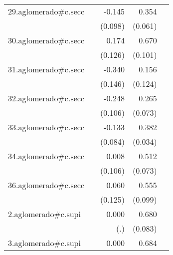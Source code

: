 {\begin{longtable}{l*{4}{D{.}{.}{-1}}}
\addlinespace
29.aglomerado#c.secc&                     &      -0.145         &       0.354\sym{***}&                     \\
            &                     &     (0.098)         &     (0.061)         &                     \\
\addlinespace
30.aglomerado#c.secc&                     &       0.174         &       0.670\sym{***}&                     \\
            &                     &     (0.126)         &     (0.101)         &                     \\
\addlinespace
31.aglomerado#c.secc&                     &      -0.340\sym{*}  &       0.156         &                     \\
            &                     &     (0.146)         &     (0.124)         &                     \\
\addlinespace
32.aglomerado#c.secc&                     &      -0.248\sym{*}  &       0.265\sym{***}&                     \\
            &                     &     (0.106)         &     (0.073)         &                     \\
\addlinespace
33.aglomerado#c.secc&                     &      -0.133         &       0.382\sym{***}&                     \\
            &                     &     (0.084)         &     (0.034)         &                     \\
\addlinespace
34.aglomerado#c.secc&                     &       0.008         &       0.512\sym{***}&                     \\
            &                     &     (0.106)         &     (0.073)         &                     \\
\addlinespace
36.aglomerado#c.secc&                     &       0.060         &       0.555\sym{***}&                     \\
            &                     &     (0.125)         &     (0.099)         &                     \\
\addlinespace
2.aglomerado#c.supi&                     &       0.000         &       0.680\sym{***}&                     \\
            &                     &         (.)         &     (0.083)         &                     \\
\addlinespace
3.aglomerado#c.supi&                     &       0.000         &       0.684\sym{***}&                     \\

\end{longtable}}
